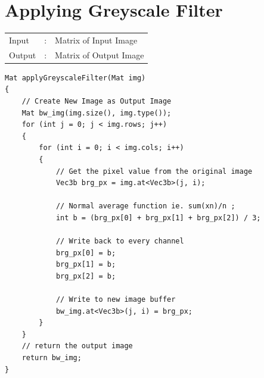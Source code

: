 \documentclass[12pt,a4paper]{report}
\begin{document}
\section{Applying Greyscale Filter}
\begin{tabular}{lll}
  Input  & : & Matrix of Input Image  \\
  Output & : & Matrix of Output Image \\
\end{tabular}
\begin{lstlisting}
Mat applyGreyscaleFilter(Mat img)
{
    // Create New Image as Output Image
    Mat bw_img(img.size(), img.type());
    for (int j = 0; j < img.rows; j++)
    {
        for (int i = 0; i < img.cols; i++)
        {
            // Get the pixel value from the original image
            Vec3b brg_px = img.at<Vec3b>(j, i);

            // Normal average function ie. sum(xn)/n ;
            int b = (brg_px[0] + brg_px[1] + brg_px[2]) / 3;

            // Write back to every channel
            brg_px[0] = b;
            brg_px[1] = b;
            brg_px[2] = b;

            // Write to new image buffer
            bw_img.at<Vec3b>(j, i) = brg_px;
        }
    }
    // return the output image
    return bw_img;
}
\end{lstlisting}
\end{document}
